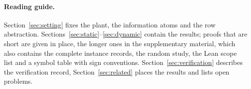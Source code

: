 \paragraph{Reading guide.} Section~\ref{sec:setting} fixes the plant, the information atoms and the row abstraction. Sections~\ref{sec:static}--\ref{sec:dynamic} contain the results; proofs that are short are given in place, the longer ones in the supplementary material, which also contains the complete instance records, the random study, the Lean scope list and a symbol table with sign conventions. Section~\ref{sec:verification} describes the verification record, Section~\ref{sec:related} places the results and lists open problems.
